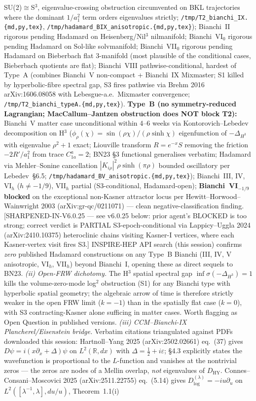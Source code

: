 \documentclass[reprint,amsmath,amssymb,aps,prd,superscriptaddress]{revtex4-2}
\providecommand{\R}{\mathbb{R}}
\providecommand{\1}{\mathbf{1}}
\begin{document}
SU(2)$\cong$S$^3$, eigenvalue-crossing obstruction circumvented on BKL trajectories where the dominant $1/a_1^2$ term orders eigenvalues strictly; \texttt{/tmp/T2\_bianchi\_IX.\{md,py,tex\}}, \texttt{/tmp/hadamard\_BIX\_anisotropic.\{md,py,tex\}}); Bianchi~II rigorous pending Hadamard on Heisenberg/Nil$^3$ nilmanifold; Bianchi~VI$_0$ rigorous pending Hadamard on Sol-like solvmanifold; Bianchi~VII$_0$ rigorous pending Hadamard on Bieberbach flat 3-manifold (most plausible of the conditional cases, Bieberbach quotients are flat); Bianchi~VIII pathwise-conditional, hardest of Type~A (combines Bianchi~V non-compact + Bianchi~IX Mixmaster; S1 killed by hyperbolic-fibre spectral gap, S3 fires pathwise via Brehm 2016 arXiv:1606.08058 with Lebesgue-a.e.\ Mixmaster convergence; \texttt{/tmp/T2\_bianchi\_typeA.\{md,py,tex\}}). \textbf{Type~B (no symmetry-reduced Lagrangian; MacCallum--Jantzen obstruction does NOT block T2):} Bianchi~V matter case unconditional within 4--6 weeks via Kontorovich--Lebedev decomposition on H$^3$ ($\phi_\rho(\chi)=\sin(\rho\chi)/(\rho\sinh\chi)$ eigenfunction of $-\Delta_{H^3}$ with eigenvalue $\rho^2+1$ exact; Liouville transform $R=e^{-x}S$ removing the friction $-2R'/a_1^2$ from trace $C^a_{1a}=2$; BN23 \S 3 functional generalises verbatim; Hadamard via Mehler--Sonine cancellation $|K_{i\rho}|^2\rho\sinh(\pi\rho)$ bounded oscillatory per Lebedev~\S 6.5; \texttt{/tmp/hadamard\_BV\_anisotropic.\{md,py,tex\}}); Bianchi~III, IV, VI$_h$ ($h\neq -1/9$), VII$_h$ partial (S3-conditional, Hadamard-open); \textbf{Bianchi~VI$_{-1/9}$ blocked} on the exceptional non-Kasner attractor locus per Hewitt--Horwood--Wainwright 2003 (arXiv:gr-qc/0211071) — clean negative-classification finding. [SHARPENED-IN-V6.0.25 — see v6.0.25 below: prior agent's BLOCKED is too strong; correct verdict is PARTIAL S3-epoch-conditional via Lappicy--Uggla 2024 (arXiv:2410.10375) heteroclinic chains visiting Kasner-I vertices, where each Kasner-vertex visit fires S3.] INSPIRE-HEP API search (this session) confirms \emph{zero} published Hadamard constructions on any Type~B Bianchi (III, IV, V anisotropic, VI$_h$, VII$_h$) beyond Bianchi~I, opening these as direct sequels to BN23. \emph{(ii) Open-FRW dichotomy.} The H$^3$ spatial spectral gap $\inf\sigma(-\Delta_{H^3})=1$ kills the volume-zero-mode log$^2$ obstruction (S1) for any Bianchi type with hyperbolic spatial geometry; the algebraic arrow of time is therefore strictly weaker in the open FRW limit ($k=-1$) than in the spatially flat case ($k=0$), with S3 contracting-Kasner alone sufficing in matter cases. Worth flagging as Open Question in published versions. \emph{(iii) CCM--Bianchi-IX Plancherel/Eisenstein bridge.} Verbatim citations triangulated against PDFs downloaded this session: Hartnoll--Yang 2025 (arXiv:2502.02661) eq.~(37) gives $D\psi=i(x\partial_x+\Delta)\psi$ on $L^2(\R,dx)$ with $\Delta=\tfrac12+i\varepsilon$; \S 4.3 explicitly states the wavefunction is proportional to the $L$-function and vanishes at the nontrivial zeros — the zeros are nodes of a Mellin overlap, \emph{not} eigenvalues of $D_\mathrm{HY}$. Connes--Consani--Moscovici 2025 (arXiv:2511.22755) eq.~(5.14) gives $D_{\log}^{(\lambda)}=-iu\partial_u$ on $L^2([\lambda^{-1},\lambda],du/u)$, Theorem~1.1(i) 
\end{document}
